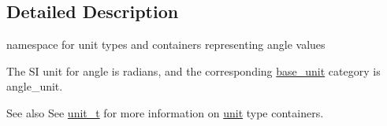 \subsection{Detailed Description}
namespace for unit types and containers representing angle values 

The S\+I unit for angle is {\ttfamily radians}, and the corresponding {\ttfamily \hyperlink{structunits_1_1base__unit}{base\+\_\+unit}} category is {\ttfamily angle\+\_\+unit}. \begin{DoxySeeAlso}{See also}
See \hyperlink{classunits_1_1unit__t}{unit\+\_\+t} for more information on \hyperlink{structunits_1_1unit}{unit} type containers. 
\end{DoxySeeAlso}
